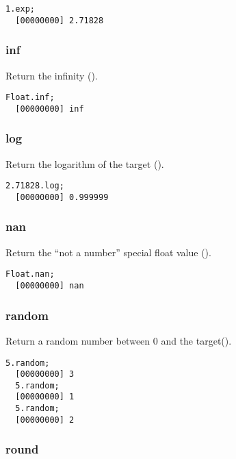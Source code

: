 \begin{lstlisting}[caption=Float.exp, label=lst:float-exp,
  float=\floatposh]
  1.exp;
  [00000000] 2.71828
\end{lstlisting}

\subsubsection{inf}

Return the infinity ().

\begin{lstlisting}[caption=Float.inf, label=lst:float-inf,
  float=\floatposh]
  Float.inf;
  [00000000] inf
\end{lstlisting}

\subsubsection{log}

Return the logarithm of the target ().

\begin{lstlisting}[caption=Float.log, label=lst:float-log,
  float=\floatposh]
  2.71828.log;
  [00000000] 0.999999
\end{lstlisting}

\subsubsection{nan}

Return the ``not a number'' special float value ().

\begin{lstlisting}[caption=Float.nan, label=lst:float-nan,
  float=\floatposh]
  Float.nan;
  [00000000] nan
\end{lstlisting}

\subsubsection{random}

Return a random number between 0 and the target().

\begin{lstlisting}[caption=Float.random, label=lst:float-random,
  float=\floatposh]
  5.random;
  [00000000] 3
  5.random;
  [00000000] 1
  5.random;
  [00000000] 2
\end{lstlisting}

\subsubsection{round}

